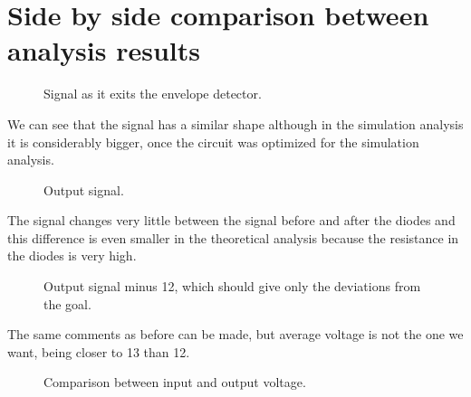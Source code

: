 \section{Side by side comparison between analysis results}
\label{sec:sidebyside}

\begin{figure}[H]
\hspace{-10mm}
  \caption{Signal as it exits the envelope detector.} 
\end{figure}

We can see that the signal has a similar shape although in the simulation analysis it is considerably bigger, once the circuit was optimized for the simulation analysis.

\begin{figure}[H]
\hspace{-10mm}
  \caption{Output signal.} 
\end{figure}

The signal changes very little between the signal before and after the diodes and this difference is even smaller in the theoretical analysis because the resistance in the diodes is very high.

\begin{figure}[H]
\hspace{-10mm}
  \caption{Output signal minus 12, which should give only the deviations from the goal.} 
\end{figure}

The same comments as before can be made, but average voltage is not the one we want, being closer to 13 than 12.

\begin{figure}[H]
\hspace{-10mm}
  \caption{Comparison between input and output voltage.} 
\end{figure}

